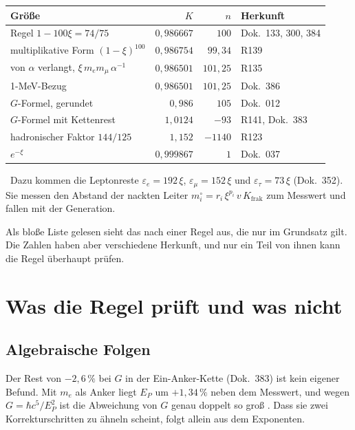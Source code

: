 \begin{center}
\begin{tabular}{@{}lrrl@{}}
\toprule
\textbf{Größe} & \textbf{$K$} & \textbf{$n$} & \textbf{Herkunft}\\
\midrule
Regel $1-100\xi=74/75$ & $0{,}986667$ & $100$ & Dok.~133, 300, 384\\
multiplikative Form $(1-\xi)^{100}$ & $0{,}986754$ & $99{,}34$ & R139\\
von $\alpha$ verlangt, $\xi\,m_em_\mu\,\alpha^{-1}$ & $0{,}986501$ & $101{,}25$ & R135\\
1-MeV-Bezug & $0{,}986501$ & $101{,}25$ & Dok.~386\\
$G$-Formel, gerundet & $0{,}986$ & $105$ & Dok.~012\\
$G$-Formel mit Kettenrest & $1{,}0124$ & $-93$ & R141, Dok.~383\\
hadronischer Faktor $144/125$ & $1{,}152$ & $-1140$ & R123\\
$e^{-\xi}$ & $0{,}999867$ & $1$ & Dok.~037\\
\bottomrule
\end{tabular}
\end{center}
\KM\ Dazu kommen die Leptonreste $\varepsilon_e=192\,\xi$, $\varepsilon_\mu=152\,\xi$ und
$\varepsilon_\tau=73\,\xi$ (Dok.~352). Sie messen den Abstand der nackten Leiter
$m_i^\circ=r_i\,\xi^{p_i}\,v\,K_{\text{frak}}$ zum Messwert und fallen mit der Generation.

Als bloße Liste gelesen sieht das nach einer Regel aus, die nur im Grundsatz gilt. Die Zahlen haben
aber verschiedene Herkunft, und nur ein Teil von ihnen kann die Regel überhaupt prüfen.

\section{Was die Regel prüft und was nicht}

\subsection{Algebraische Folgen}

Der Rest von $-2{,}6\,\%$ bei $G$ in der Ein-Anker-Kette (Dok.~383) ist kein eigener Befund. Mit
$m_e$ als Anker liegt $E_P$ um $+1{,}34\,\%$ neben dem Messwert, und wegen $G=\hbar c^5/E_P^2$ ist die
Abweichung von $G$ genau doppelt so groß \BM. Dass sie zwei Korrekturschritten zu ähneln scheint,
folgt allein aus dem Exponenten.

